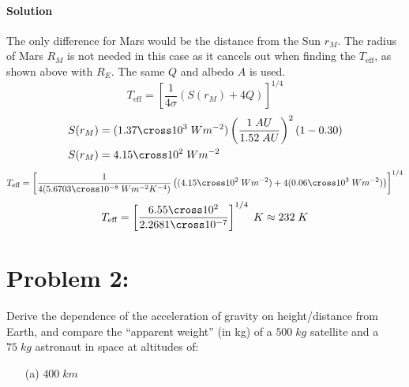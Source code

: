 \documentclass{article}
\begin{document}
{\begin{enumerate}
		\paragraph{Solution} The only difference for Mars would be the distance from the Sun $r_M$. The radius of Mars $R_M$ is not needed in this case as it cancels out when finding the $T_{\text{eff}}$, as shown above with $R_E$. The same $Q$ and albedo $A$ is used. \unboldmath
			\[
				T_{\text{eff}} = \left[ \frac{1}{4\sigma } \left(S(r_M) + 4Q\right) \right]^{1/4}	
			\]
			\begin{equation*}
				\begin{split}
					S(r_M) &= ( 1.37 \cross 10^3 \; W m^{-2}) \left( \frac{1 \; AU}{1.52 \; AU} \right)^2 ( 1 - 0.30 ) \\
					S(r_M) &= 4.15 \cross 10^2 \; W m^{-2} \\
				\end{split}
			\end{equation*}
			\[
				T_{\text{eff}} = \left[ \frac{1}{4 (5.6703 \cross 10^{-8} \; Wm^{-2}K^{-4} ) } \left( (4.15 \cross 10^2 \; W m^{-2}) + 4(0.06 \cross 10^3 \; W m^{-2}) \right) \right]^{1/4}	
			\]
			\[
				T_{\text{eff}} = \left[ \frac{6.55 \cross 10^2}{2.2681 \cross 10^{-7}} \right]^{1/4} \; K \approx 232 \; K
			\]
		
	\end{enumerate}
	
	\section*{Problem 2: }
	\boldmath
	Derive the dependence of the acceleration of gravity on height/distance from Earth, and compare the “apparent weight” (in kg) of a $500 \; kg$ satellite and a $75 \; kg$ astronaut in space at altitudes of: \\
	\begin{enumerate}
		\item[(a)] $400 \; km$

\end{enumerate}}
\end{document}
